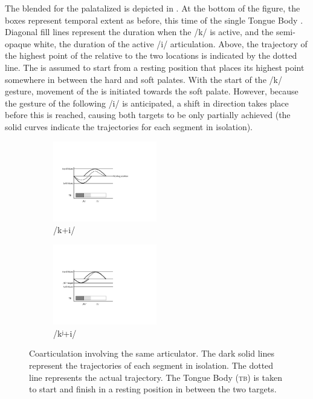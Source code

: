 The blended  for the palatalized  is depicted in . 
At the bottom of the figure, the boxes represent
temporal extent as before, this time of the single Tongue Body .
Diagonal fill lines represent the duration when the {/k/}
 is active, and the semi-opaque white, the duration of the active
{/i/} articulation. Above, the trajectory of the highest
point of the  relative to the two  locations is indicated
by the dotted line. The  is assumed to start from a resting
position that places its highest point somewhere in between the hard
and soft palates. With the start of the {/k/} gesture, movement
of the  is initiated towards the soft palate. However,
because the gesture of the following {/i/} is anticipated,
a shift in direction takes place before this  is reached, causing
both targets to be only partially achieved (the solid curves indicate
the  trajectories for each segment in isolation). 

\begin{figure}[H]
\begin{subfigure}[t]{.60\textwidth}
        \centering\includegraphics[height=3.5cm]{figures/palatalizationa.pdf}
        \caption{\label{fig:/k+i}/k+i/}
    \end{subfigure}%
    \begin{subfigure}[t]{.40\textwidth}
        \centering\includegraphics[height=3.5cm]{figures/palatalizationb.pdf}
        \caption{\label{fig:/k=0002B2+i/} {/kʲ+i/}}
\end{subfigure}
    
    

\caption{Coarticulation involving the same articulator. The dark solid lines
represent the trajectories of each segment in isolation. The dotted
line represents the actual trajectory. The Tongue Body (\textsc{tb}) is taken
to start and finish in a resting position in between the two targets. }
\end{figure}


